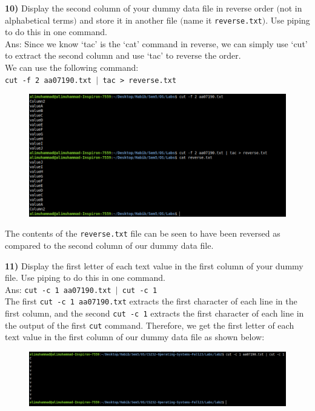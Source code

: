\documentclass{article}
\theoremstyle{mytheoremstyle}
\theoremstyle{mytheoremstyle}
\theoremstyle{myproblemstyle}
\begin{document}
\pagebreak
\textbf{10)} Display the second column of your dummy data file in reverse order $($not in alphabetical terms$)$ and store it in another file $($name it \texttt{reverse.txt}$)$. Use piping to do this in one command. \\
Ans: Since we know `tac' is the `cat' command in reverse, we can simply use `cut' to extract the second column and use `tac' to reverse the order. \\ We can use the following command: \\ \texttt{cut -f 2 aa07190.txt $|$ tac > reverse.txt} 
\begin{figure}[htbp]
    \includegraphics[width=1.0\textwidth]{lab2_10.png}
\end{figure}

The contents of the \texttt{reverse.txt} file can be seen to have been reversed as compared to the second column of our dummy data file.

\vspace*{10mm}
\textbf{11)} Display the first letter of each text value in the first column of your dummy file. Use piping to do this in one command. \\ 
Ans: \texttt{cut -c 1 aa07190.txt $|$ cut -c 1} \\
The first \texttt{cut -c 1 aa07190.txt} extracts the first character of each line in the first column, and the second \texttt{cut -c 1} extracts the first character of each line in the output of the first \texttt{cut} command. Therefore, we get the first letter of each text value in the first column of our dummy data file as shown below:
\begin{figure}[htbp]
    \includegraphics[width=1.0\textwidth]{lab2_11.png}
\end{figure}
\end{document}

